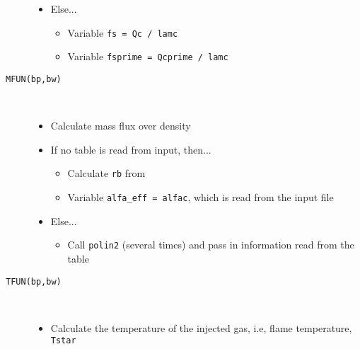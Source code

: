 \begin{description}
{\begin{itemize}
\begin{itemize}
\begin{itemize}
			\end{itemize}
		
		\item{Else...}
			\begin{itemize}
				\item{Call \texttt{polin2} (several times) and pass in information read from the table}
			\end{itemize}	
		
	\end{itemize}

\item{Else...}

	\begin{itemize}
		\item{Variable \texttt{fs = Qc / lamc}}
		\item{Variable \texttt{fsprime = Qcprime / lamc}}
	\end{itemize}

\end{itemize}
}

\item[\texttt{MFUN(bp,bw)}]{\hfill \\ \vspace{-15pt}
\begin{itemize}
\item{Calculate mass flux over density}

\item{If no table is read from input, then...}
	\begin{itemize}
		\item{Calculate \texttt{rb} from }
		\item{Variable \texttt{alfa\_eff = alfac}, which is read from the input file}
	\end{itemize}
			
\item{Else...}
	\begin{itemize}
		\item{Call \texttt{polin2} (several times) and pass in information read from the table}
	\end{itemize}

\end{itemize}
}

\item[\texttt{TFUN(bp,bw)}]{\hfill \\ \vspace{-15pt}
\begin{itemize}
\item{Calculate the temperature of the injected gas, i.e, flame temperature, \texttt{Tstar}}


\end{itemize}}
\end{description}
